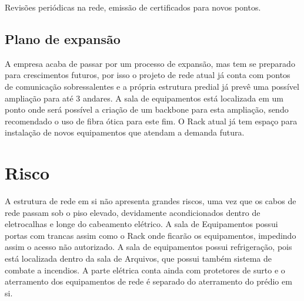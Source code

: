 \documentclass[	DIV=calc,%
paper=a4,%
fontsize=12pt,%
onecolumn]{scrartcl}	 					%
\begin{document}
	Revisões periódicas na rede, emissão de certificados para novos pontos.
	
	\subsection{Plano de expansão}
	A empresa acaba de passar por um processo de expansão, mas tem se preparado para crescimentos futuros, por isso o projeto de rede atual já conta com pontos de comunicação sobressalentes e a própria estrutura predial já prevê uma possível ampliação para até 3 andares. A sala de equipamentos está localizada em um ponto onde será possível a criação de um backbone para esta  ampliação, sendo recomendado o uso de fibra ótica para este fim. O Rack atual já tem espaço para instalação de novos equipamentos que atendam a demanda futura.
	
	\section{Risco}
	A estrutura de rede em si não apresenta grandes riscos, uma vez que os cabos de rede passam sob o piso elevado, devidamente acondicionados dentro de eletrocalhas e longe do cabeamento elétrico. A sala de Equipamentos possui portas com trancas assim como o Rack onde ficarão os equipamentos, impedindo assim o acesso não autorizado. A sala de equipamentos possui refrigeração, pois está localizada dentro da sala de Arquivos, que possui também sistema de combate a incendios. A parte elétrica conta ainda com protetores de surto e o aterramento dos equipamentos de rede é separado do aterramento do prédio em si.
	
\end{document}
